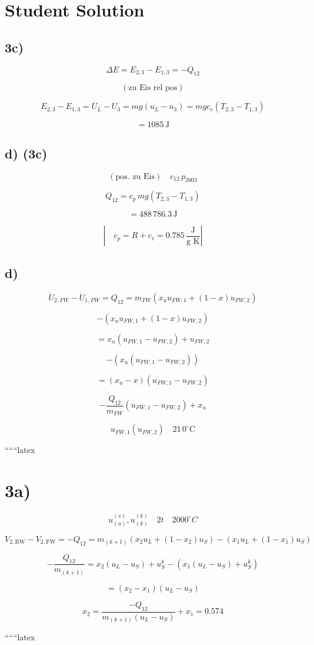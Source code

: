 \section*{Student Solution}

\subsection*{3c)}

\[
\Delta E = E_{2,3} - E_{1,3} = -Q_{12}
\]

\[
\left( \text{zu Eis rel pos} \right)
\]

\[
E_{2,3} - E_{1,3} = U_L - U_3 = m g (u_L - u_3) = m g c_v (T_{2,3} - T_{1,3})
\]

\[
= 1085 \, \text{J}
\]

\subsection*{d) (3c)}

\[
\left( \text{pos. zu Eis} \right) \quad c_{12} \, p_{2003}
\]

\[
Q_{12} = c_p \, m g \left( T_{2,3} - T_{1,3} \right)
\]

\[
= 488 \, 786.3 \, \text{J}
\]

\[
\left| \quad c_p = R + c_v = 0.785 \, \frac{\text{J}}{\text{g K}} \right|
\]

\subsection*{d)}

\[
\dot{U}_{2,FW} - \dot{U}_{1,FW} = Q_{12} = m_{FW} \left( x_u u_{FW,1} + (1 - x) u_{FW,2} \right)
\]

\[
- \left( x_u u_{FW,1} + (1 - x) u_{FW,2} \right)
\]

\[
= x_u \left( u_{FW,1} - u_{FW,2} \right) + u_{FW,2}
\]

\[
- \left( x_u \left( u_{FW,1} - u_{FW,2} \right) \right)
\]

\[
= \left( x_u - x \right) \left( u_{FW,1} - u_{FW,2} \right)
\]

\[
- \frac{Q_{12}}{m_{FW}} \left( u_{FW,1} - u_{FW,2} \right) + x_u
\]

\[
u_{FW,1} \left( u_{FW,2} \right) \quad 21 \, 0^\circ \text{C}
\]

``````latex


\section*{3a)}

\[
u_{(a)}^{(s)}, u_{(k)}^{(k)} \quad 2t \quad 2000^\circ C
\]

\[
V_{2, \text{RW}} - V_{2, \text{FW}} = -Q_{12} = m_{(k+1)} \left( x_2 u_L + (1 - x_2) u_S \right) - \left( x_1 u_L + (1 - x_1) u_S \right)
\]

\[
-\frac{Q_{12}}{m_{(k+1)}} = x_2 (u_L - u_S) + u_S^k - (x_1 (u_L - u_S) + u_S^k)
\]

\[
= (x_2 - x_1) (u_L - u_S)
\]

\[
x_2 = \frac{-Q_{12}}{m_{(k+1)} (u_L - u_S)} + x_1 = 0.574
\]

``````latex


